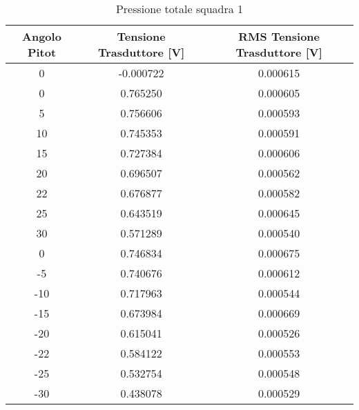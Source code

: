 \newpage
\begin{table}[ht]
\centering
\begin{tabular}{|c|c|c|}
\hline
Angolo Pitot & Tensione Trasduttore {[}V{]} & RMS Tensione Trasduttore {[}V{]} \\ \hline
0            & -0.000722                    & 0.000615                         \\ \hline
0            & 0.765250                     & 0.000605                         \\ \hline
5            & 0.756606                     & 0.000593                         \\ \hline
10           & 0.745353                     & 0.000591                         \\ \hline
15           & 0.727384                     & 0.000606                         \\ \hline
20           & 0.696507                     & 0.000562                         \\ \hline
22           & 0.676877                     & 0.000582                         \\ \hline
25           & 0.643519                     & 0.000645                         \\ \hline
30           & 0.571289                     & 0.000540                         \\ \hline
0            & 0.746834                     & 0.000675                         \\ \hline
-5           & 0.740676                     & 0.000612                         \\ \hline
-10          & 0.717963                     & 0.000544                         \\ \hline
-15          & 0.673984                     & 0.000669                         \\ \hline
-20          & 0.615041                     & 0.000526                         \\ \hline
-22          & 0.584122                     & 0.000553                         \\ \hline
-25          & 0.532754                     & 0.000548                         \\ \hline
-30          & 0.438078                     & 0.000529                         \\ \hline
\end{tabular}
\caption{Pressione totale squadra 1}
\end{table}

